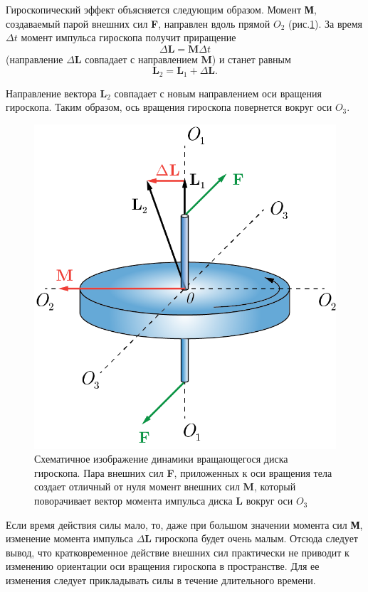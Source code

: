 \documentclass[All.tex]{subfiles}
\begin{document}
	Гироскопический эффект объясняется следующим образом.
	Момент  \textbf{М}, создаваемый парой внешних сил \textbf{F}, направлен вдоль прямой $ O_2 $ (рис.\ref{gyro-3}). 
	За время $ \Delta t $ момент импульса гироскопа получит приращение $$ \Delta \textbf{L} = \textbf{M} \Delta t $$ (направление $ \Delta \textbf{L} $ совпадает с направлением \textbf{M}) и станет равным $$ \textbf{L}_2=\textbf{L}_1+\Delta \textbf{L}. $$
	
	Направление вектора $ \textbf{L}_2 $ совпадает с новым направлением оси вращения гироскопа.
	Таким образом, ось вращения гироскопа повернется вокруг оси $ O_3 $.
	
			\begin{figure}[H]
	\centering 	
	\includegraphics[width=0.6\linewidth]{gyro-3.png}
	\caption{Схематичное изображение динамики вращающегося диска гироскопа. Пара внешних сил \textbf{F}, приложенных к оси вращения тела создает отличный от нуля момент внешних сил \textbf{M}, который поворачивает вектор момента импульса диска $ \textbf{L} $ вокруг оси $ O_3 $}
	\label{gyro-3}
\end{figure}
	
	Если время действия силы мало, то, даже при большом значении момента сил \textbf{М}, изменение момента импульса $ \Delta\textbf{L} $ гироскопа будет очень малым.
	Отсюда следует вывод, что кратковременное действие внешних сил практически не приводит к изменению ориентации оси вращения гироскопа в пространстве.
	Для ее изменения следует прикладывать силы в течение длительного времени.
	
\end{document}
